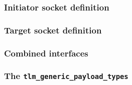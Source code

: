{\begin{frame}
	\frametitle{Initiator socket definition}
	
\end{frame}

\begin{frame}
	\frametitle{Target socket definition}
	
\end{frame}

\begin{frame}
	\frametitle{Combined interfaces}
	
\end{frame}

\begin{frame}
	\frametitle{The \texttt{tlm\_generic\_payload\_types}}
	
\end{frame}
}
